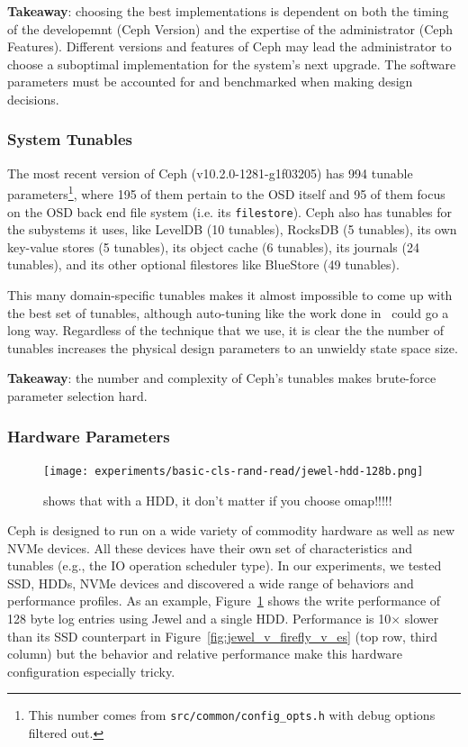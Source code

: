 \documentclass[10pt,twocolumn]{article}
\begin{document}
\textbf{Takeaway}: choosing the best implementations is dependent on both the
timing of the developemnt (Ceph Version) and the expertise of the administrator
(Ceph Features). Different versions and features of Ceph may lead the
administrator to choose a suboptimal implementation for the system's next
upgrade. The software parameters must be accounted for and benchmarked when
making design decisions.

\subsubsection{System Tunables}

The most recent version of Ceph (v10.2.0-1281-g1f03205) has 994 tunable
parameters\footnote{This number comes from \texttt{src/common/config\_opts.h}
with debug options filtered out.}, where 195 of them pertain to the OSD itself
and 95 of them focus on the OSD back end file system (i.e. its
\texttt{filestore}). Ceph also has tunables for the subystems it uses, like
LevelDB (10 tunables), RocksDB (5 tunables), its own key-value stores (5
tunables), its object cache (6 tunables), its journals (24 tunables), and its
other optional filestores like BlueStore (49 tunables).

This many domain-specific tunables makes it almost impossible to come up with
the best set of tunables, although auto-tuning like the work done
in~\cite{behzad:sc2013-autotuning} could go a long way. Regardless of the
technique that we use, it is clear the the number of tunables increases the
physical design parameters to an unwieldy state space size.

\textbf{Takeaway}: the number and complexity of Ceph's tunables makes
brute-force parameter selection hard.

\subsubsection{Hardware Parameters}

\begin{figure}[t]
	\centering
	\texttt{[image: experiments/basic-cls-rand-read/jewel-hdd-128b.png]}
	\caption{shows that with a HDD, it don't matter if you choose omap!!!!!}
	\label{fig:jewel-hdd-128b}
\end{figure}

Ceph is designed to run on a wide variety of commodity hardware as well as new
NVMe devices. All these devices have their own set of characteristics and
tunables (e.g., the IO operation scheduler type). In our experiments, we tested
SSD, HDDs, NVMe devices and discovered a wide range of behaviors and
performance profiles. As an example, Figure~\ref{fig:jewel-hdd-128b} shows the
write performance of 128 byte log entries using Jewel and a single HDD.
Performance is 10\(\times\) slower than its SSD counterpart in
Figure~\ref{fig:jewel_v_firefly_v_es} (top row, third column) but the behavior
and relative performance make this hardware configuration especially tricky.
\end{document}
